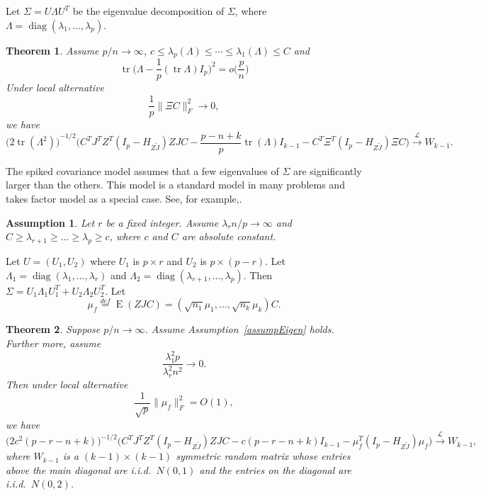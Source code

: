 \documentclass[review]{elsarticle}
\DeclareMathOperator{\mytr}{tr}
\DeclareMathOperator{\mydiag}{diag}
\DeclareMathOperator{\myE}{E}
\theoremstyle{plain}
\newtheorem{theorem}{\quad\quad Theorem}
\newtheorem{assumption}{\quad\quad Assumption}
\theoremstyle{definition}
\theoremstyle{remark}
\begin{document}
Let $\Sigma= U\Lambda U^T$ be the eigenvalue decomposition of $\Sigma$, where $\Lambda =\mydiag (\lambda_1,\ldots,\lambda_p)$.


\begin{theorem}\label{nonSpiked}
    Assume $p/n\to \infty$, $c\leq \lambda_p(\Lambda)\leq \cdots\leq \lambda_1(\Lambda)\leq C$ and
    $$
    \mytr\Big(\Lambda-\frac{1}{p}(\mytr\Lambda)I_p\Big)^2=o\big(\frac{p}{n}\big)
    $$
   Under local alternative 
    $$\frac{1}{p}\|\Xi C\|_F^2\to 0,$$
    we have
    $$
    {\Big(2\mytr (\Lambda^2)\Big)}^{-1/2}{\Big(C^TJ^T Z^T(I_p-H_{Z\tilde J}) ZJC- \frac{p-n+k}{p}\mytr(\Lambda)I_{k-1}-C^T \Xi^T (I_p-H_{Z\tilde{J}})\Xi C}\Big)
    \xrightarrow{\mathcal{L}}W_{k-1}.
    $$
\end{theorem}

The spiked covariance model assumes that a few eigenvalues of $\Sigma$ are significantly larger than the others. This model is a standard model in many problems and takes factor model as a special case.
See, for example,.

\begin{assumption}\label{assumpEigen}
    Let $r$ be a fixed integer.
    Assume ${\lambda_r n}/{p}\to \infty$ and $C \geq \lambda_{r+1} \geq \ldots \geq \lambda_{p} \geq c$, where $c$ and $C$ are absolute constant.
\end{assumption}
Let $U=(U_1,U_2)$ where $U_1$ is $p\times r$ and $U_2$ is $p\times (p-r)$. Let $\Lambda_1=\mydiag(\lambda_1,\ldots,\lambda_r)$ and $\Lambda_2=\mydiag(\lambda_{r+1},\ldots,\lambda_p)$.
Then $\Sigma=U_1\Lambda_1 U_1^T+U_2\Lambda_2 U_2^T$.
Let
$$
\mu_{f}\overset{def}{=}
\myE (ZJC) =(\sqrt{n_1}\mu_1,\ldots,\sqrt{n_k}\mu_k) C.
$$




\begin{theorem}\label{thm1}
    Suppose $p/n\to \infty$.
    Assume Assumption~\eqref{assumpEigen} holds.
    Further more, assume
\begin{equation}
    \frac{\lambda_1^2 p}{\lambda_r^2 n^2}\to 0.
\end{equation}
    Then under local alternative
    \begin{equation}
        \frac{1}{\sqrt{p}}\|\mu_f\|_F^2=O(1),
    \end{equation}
    we have
    \begin{equation}
        \big(2c^2(p-r-n+k)\big)^{-1/2}\big( C^TJ^T Z^T(I_p-H_{Z\tilde J}) ZJC-c(p-r-n+k) I_{k-1} -\mu_f^T(I_p-H_{Z\tilde J})\mu_f\big)\xrightarrow{\mathcal{L}} W_{k-1},
    \end{equation}
where $W_{k-1}$ is a $(k-1)\times(k-1)$ symmetric random matrix whose entries above the main diagonal are i.i.d.\ $N(0,1)$ and the entries on the diagonal are i.i.d.\ $N(0,2)$.
\end{theorem}
\end{document}
